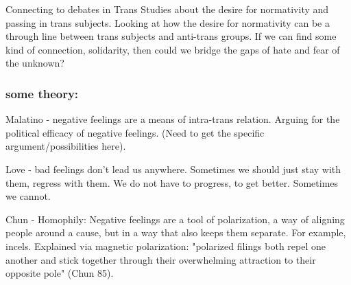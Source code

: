 \documentclass[11pt]{article}
\begin{document}
Connecting to debates in Trans Studies about the desire for
normativity and passing in trans subjects. Looking at how the desire
for normativity can be a through line between trans subjects and
anti-trans groups. If we can find some kind of connection, solidarity,
then could we bridge the gaps of hate and fear of the unknown?

\subsubsection{some theory:}
\label{sec:org73f3f95}
Malatino - negative feelings are a means of intra-trans relation.
Arguing for the political efficacy of negative feelings. (Need to get
the specific argument/possibilities here).

Love - bad feelings don't lead us anywhere. Sometimes we should just
stay with them, regress with them. We do not have to progress, to get
better. Sometimes we cannot. 

Chun - Homophily: Negative feelings are a tool of polarization, a way
of aligning people around a cause, but in a way that also keeps them
separate. For example, incels. Explained via magnetic polarization:
"polarized filings both repel one another and stick together through
their overwhelming attraction to their opposite pole" (Chun 85).
\end{document}
